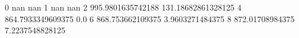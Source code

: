 0 nan nan
1 nan nan
2 995.9801635742188 131.18682861328125
4 864.7933349609375 0.0
6 868.753662109375 3.9603271484375
8 872.01708984375 7.2237548828125
